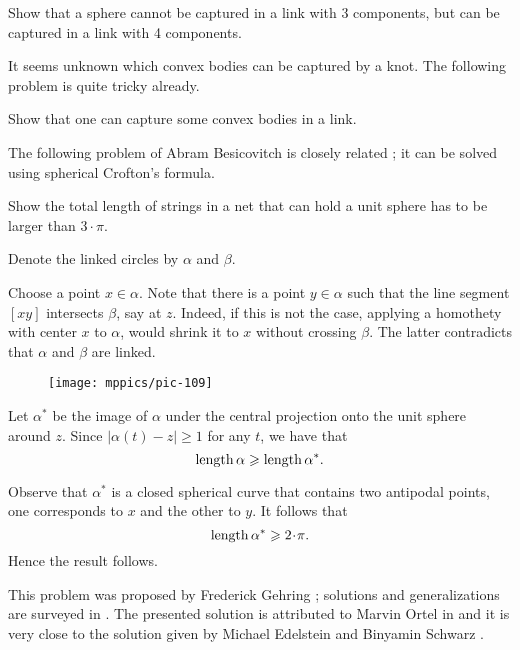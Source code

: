 \begin{pr}
Show that a sphere cannot be captured in a link with 3 components, but can be captured in a link with 4 components.
\end{pr}

It seems unknown which convex bodies can be captured by a knot.
The following problem is quite tricky already.

\begin{pr}
Show that one can capture some convex bodies in a link.
\end{pr}

The following problem of Abram Besicovitch is closely related \cite{besicovitch-sphere}; it can be solved using spherical Crofton's formula.

\begin{pr}
Show the total length of strings in a net that can hold a unit sphere has to be larger than $3\cdot\pi$.
\end{pr}







Denote the linked circles by $\alpha$ and $\beta$. 

Choose a point $x\in\alpha$. 
Note that there is a point $y\in\alpha$ such that the line segment 
$[xy]$ intersects $\beta$, say at $z$. 
Indeed, if this is not the case, 
applying a homothety with center $x$ to $\alpha$, would shrink it to $x$ without crossing $\beta$.
The latter contradicts that $\alpha$ and $\beta$ are linked. 

\begin{wrapfigure}{r}{25 mm}
\vskip-2mm
\centering
\texttt{[image: mppics/pic-109]}
\end{wrapfigure}

Let $\alpha^{*}$ be the image of $\alpha$ under the central projection onto the unit sphere around $z$.
Since $|\alpha(t)-z|\ge1$ for any $t$, we have that
$$\operatorname{\rm length} \alpha\geqslant \operatorname{\rm length}\alpha^{*}.$$

Observe that $\alpha^{*}$ is a closed spherical curve that contains two antipodal points,
one corresponds to $x$ and the other to $y$.
It follows that
$$\length \alpha^{*}\ge 2\cdot\pi.$$
Hence the result follows.\qeds



This problem was proposed by Frederick Gehring \cite[see 7.22 in][]{gehring};
solutions and generalizations are surveyed in \cite{mateljevic}. 
The presented solution is attributed to Marvin Ortel in \cite{CJKSW} and it is very close to the solution given by Michael Edelstein and Binyamin Schwarz \cite{edelstein-schwatz}.

